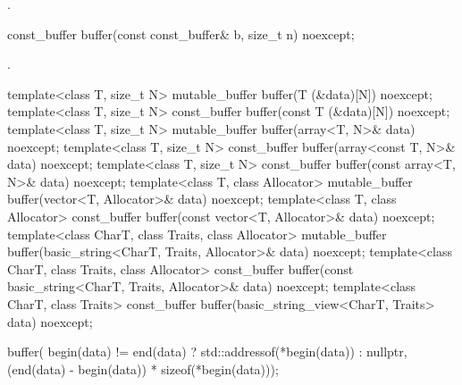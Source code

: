 \begin{itemdescr}
\pnum
\returns {}.
\end{itemdescr}

\begin{itemdecl}
const_buffer buffer(const const_buffer& b, size_t n) noexcept;
\end{itemdecl}

\begin{itemdescr}
\pnum
\returns {}.
\end{itemdescr}

\begin{itemdecl}
template<class T, size_t N>
  mutable_buffer buffer(T (&data)[N]) noexcept;
template<class T, size_t N>
  const_buffer buffer(const T (&data)[N]) noexcept;
template<class T, size_t N>
  mutable_buffer buffer(array<T, N>& data) noexcept;
template<class T, size_t N>
  const_buffer buffer(array<const T, N>& data) noexcept;
template<class T, size_t N>
  const_buffer buffer(const array<T, N>& data) noexcept;
template<class T, class Allocator>
  mutable_buffer buffer(vector<T, Allocator>& data) noexcept;
template<class T, class Allocator>
  const_buffer buffer(const vector<T, Allocator>& data) noexcept;
template<class CharT, class Traits, class Allocator>
  mutable_buffer buffer(basic_string<CharT, Traits, Allocator>& data) noexcept;
template<class CharT, class Traits, class Allocator>
  const_buffer buffer(const basic_string<CharT, Traits, Allocator>& data) noexcept;
template<class CharT, class Traits>
  const_buffer buffer(basic_string_view<CharT, Traits> data) noexcept;
\end{itemdecl}

\begin{itemdescr}
\pnum
\returns 
\begin{codeblock}
buffer(
  begin(data) != end(data) ? std::addressof(*begin(data)) : nullptr,
  (end(data) - begin(data)) * sizeof(*begin(data)));
\end{codeblock}

\end{itemdescr}

